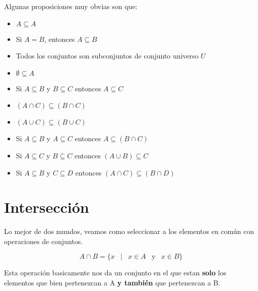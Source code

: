 \documentclass[12pt, fleqn]{report}                             %
\DeclareMathOperator \Space {\quad}                             %
\DeclareMathOperator \MiniSpace {\;}                            %
\newcommand \Such {\MiniSpace|\MiniSpace}                       %
\newcommand \Also {\MiniSpace \text{y} \MiniSpace}              %
\begin{document}
                Algunas proposiciones muy obvias son que:
                \begin{itemize}
                    \item $A \subseteq A$
                    \item Si $A = B$, entonces $A \subseteq B$
                    \item Todos los conjuntos son subconjuntos de conjunto universo $U$
                    \item $\emptyset \subseteq A$
                    \item Si $A \subseteq B$ y $B \subseteq C$ entonces $A \subseteq C$
                    \item $(A \cap C) \subseteq (B \cap C)$
                    \item $(A \cup C) \subseteq (B \cup C)$
                    \item Si $A \subseteq B$ y $A \subseteq C$ entonces $A \subseteq (B \cap C)$
                    \item Si $A \subseteq C$ y $B \subseteq C$ entonces $(A \cup B) \subseteq C$
                    \item Si $A \subseteq B$ y $C \subseteq D$ entonces $(A \cap C) \subseteq (B \cap D)$
                \end{itemize}









        \clearpage
        \section{Intersección}

            Lo mejor de dos mundos, veamos como seleccionar a los elementos en común con operaciones
            de conjuntos.

            \begin{equation}
                A \cap B = \{ x \Such x \in A \Also x \in B \}
            \end{equation}

            Esta operación basicamente nos da un conjunto en el que estan \textbf{solo} los elementos
            que bien pertenezcan a A \textbf{y también} que pertenezcan a B.
\end{document}
